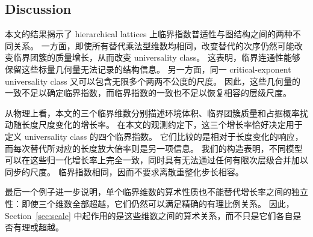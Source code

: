 \documentclass[scheme=plain,11pt]{ctexart}
\theoremstyle{definition}
\theoremstyle{remark}
\begin{document}
\subsection{Discussion}\label{sec:discussion}

本文的结果揭示了 hierarchical lattices 上临界指数普适性与图结构之间的两种不同关系。
一方面，即使所有替代乘法型维数均相同，改变替代的次序仍然可能改变临界团簇的质量增长，从而改变 universality class。
这表明，临界连通性能够保留这些标量几何量无法记录的结构信息。
另一方面，同一 critical-exponent universality class 又可以包含无限多个两两不公度的尺度。
因此，这些几何量的一致不足以确定临界指数，而临界指数的一致也不足以恢复相容的层级尺度。

从物理上看，本文的三个临界维数分别描述环境体积、临界团簇质量和占据概率扰动随长度尺度变化的增长率。
在本文的观测约定下，这三个增长率恰好决定用于定义 universality class 的四个临界指数。
它们比较的是相对于长度变化的响应，而每次替代所对应的长度放大倍率则是另一项信息。
我们的构造表明，不同模型可以在这些归一化增长率上完全一致，同时具有无法通过任何有限次层级合并加以同步的尺度。
临界指数相同，因而不要求离散重整化步长相容。

最后一个例子进一步说明，单个临界维数的算术性质也不能替代增长率之间的独立性：即使三个维数全部超越，它们仍然可以满足精确的有理比例关系。
因此，Section~\ref{sec:scale} 中起作用的是这些维数之间的算术关系，而不只是它们各自是否有理或超越。
\end{document}
